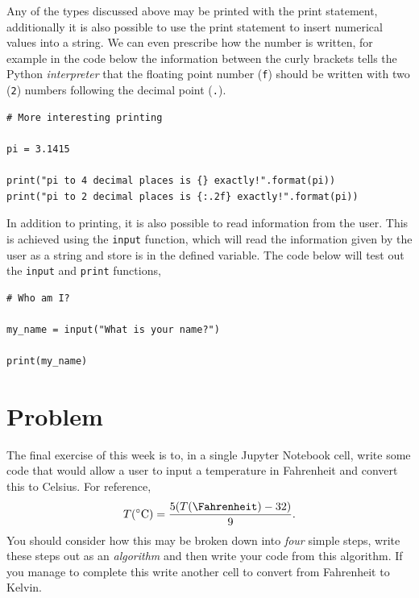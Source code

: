\documentclass[a4paper]{article}
\begin{document}
Any of the types discussed above may be printed with the print statement, additionally it is also possible to use the print statement to insert numerical values into a string.
We can even prescribe how the number is written, for example in the code below the information between the curly brackets tells the Python \emph{interpreter} that the floating point number (\texttt{f}) should be written with two (\texttt{2}) numbers following the decimal point (\texttt{.}).  
\begin{lstlisting}
# More interesting printing

pi = 3.1415

print("pi to 4 decimal places is {} exactly!".format(pi))
print("pi to 2 decimal places is {:.2f} exactly!".format(pi))
\end{lstlisting}

In addition to printing, it is also possible to read information from the user.
This is achieved using the \texttt{input} function, which will read the information given by the user as a string and store is in the defined variable. 
The code below will test out the \texttt{input} and \texttt{print} functions, 
\begin{lstlisting}
# Who am I?

my_name = input("What is your name?")

print(my_name)
\end{lstlisting}

\section{Problem}

The final exercise of this week is to, in a single Jupyter Notebook cell, write some code that would allow a user to input a temperature in Fahrenheit and convert this to Celsius. 
For reference, 
\begin{equation}
	T (\si{\celsius}) = \frac{5 ( T(\si{\Fahrenheit}) - 32)}{9}.
\end{equation}
You should consider how this may be broken down into \emph{four} simple steps, write these steps out as an \emph{algorithm} and then write your code from this algorithm.
If you manage to complete this write another cell to convert from Fahrenheit to Kelvin. 



\end{document}
